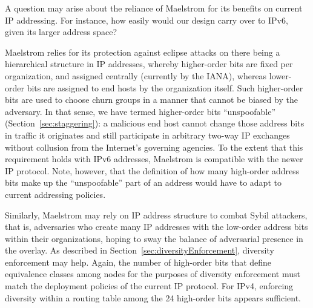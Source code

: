 \documentclass[10pt,twocolumn]{article}
\begin{document}
A question may arise about the reliance of Maelstrom for its benefits
on current IP addressing.
For instance, how easily would
our design carry over to IPv6, given its larger address space?

Maelstrom relies for its protection against eclipse attacks on there
being a hierarchical structure in IP addresses, whereby higher-order
bits are fixed per organization, and assigned centrally (currently by
the IANA), whereas lower-order bits are assigned to end hosts by the
organization itself.  Such higher-order bits are used to choose churn
groups in a manner that cannot be biased by the adversary.  In that
sense, we have termed higher-order bits
``unspoofable'' (Section~\ref{sec:staggering}): a malicious end host
cannot change those address bits in traffic it originates and still
participate in arbitrary two-way IP
exchanges without collusion from the Internet's governing agencies.
To the extent that this requirement holds with IPv6 addresses, Maelstrom
is compatible with the newer IP protocol.  Note, however, that the
definition of how many high-order address bits make up the
``unspoofable'' part of an address would have to adapt to current addressing
policies.

Similarly, Maelstrom may rely on IP address structure to combat Sybil
attackers, that is, adversaries who create many IP addresses with the
low-order address bits within their organizations, hoping to sway the
balance of adversarial presence in the overlay.  As described in Section~\ref{sec:diversityEnforcement},
diversity enforcement may help.  Again, the number of high-order bits
that define equivalence classes among nodes for the purposes of
diversity enforcement must match the deployment policies of the current
IP protocol.  For IPv4, enforcing diversity within a routing table among
the 24 high-order bits appears sufficient.



\end{document}
